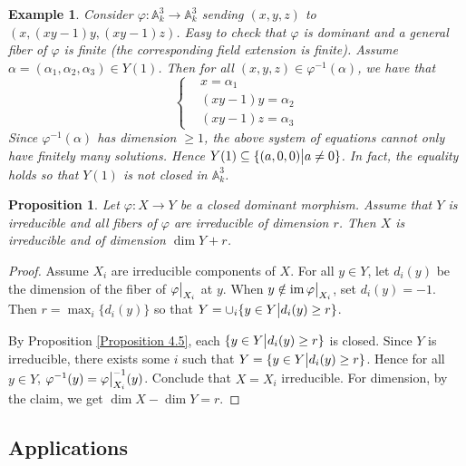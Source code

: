 \documentclass{ctexart}
\newtheorem{proposition}{Proposition}[section]
\newtheorem{example}{Example}[section]
\newcommand{\im}{\operatorname{im}}
\begin{document}
\begin{example}
    Consider $\varphi: \mathbb{A}_{k}^{3} \rightarrow \mathbb{A}_{k}^{3}$ sending $(x, y, z)$ to $(x, (xy - 1)y, (xy - 1)z)$.
    Easy to check that $\varphi$ is dominant and a general fiber of $\varphi$ is finite (the corresponding field extension is finite).
    Assume $\alpha = (\alpha_{1}, \alpha_{2}, \alpha_{3})\in Y(1)$.
    Then for all $(x, y, z)\in \varphi^{-1}(\alpha)$, we have that
    \begin{equation}
        \left\{
            \begin{aligned}
                & x = \alpha_{1} \\
                & (xy - 1)y = \alpha_{2} \\
                & (xy - 1)z = \alpha_{3}
            \end{aligned}
        \right.
        \label{equation:defining_equations_of_fiber_at_alpha}
    \end{equation}
    Since $\varphi^{-1}(\alpha)$ has dimension $\ge 1$, the above system of equations cannot only have finitely many solutions.
    Hence $Y(1) \subseteq \{(a, 0, 0) \big{|} a \neq 0\}$.
    In fact, the equality holds so that $Y(1)$ is not closed in $\mathbb{A}_{k}^{3}$.
\end{example}
\begin{proposition}
    Let $\varphi: X \rightarrow Y$ be a closed dominant morphism.
    Assume that $Y$ is irreducible and all fibers of $\varphi$ are irreducible of dimension $r$.
    Then $X$ is irreducible and of dimension $\dim Y + r$.
    \label{Proposition 4.6}
\end{proposition}
\begin{proof}
    Assume $X_{i}$ are irreducible components of $X$.
    For all $y\in Y$, let $d_{i}(y)$ be the dimension of the fiber of $\varphi\big{|}_{X_{i}}$ at $y$.
    When $y\notin \im \varphi\big{|}_{X_{i}}$, set $d_{i}(y) = -1$.
    Then $r = \max_{i} \{d_{i}(y)\}$ so that $Y = \cup_{i} \{y\in Y \big{|} d_{i}(y) \ge r\}$.
    \par
    By Proposition \ref{Proposition 4.5}, each $\{y\in Y \big{|} d_{i}(y) \ge r\}$ is closed.
    Since $Y$ is irreducible, there exists some $i$ such that $Y = \{y\in Y \big{|} d_{i}(y) \ge r\}$.
    Hence for all $y\in Y$, $\varphi^{-1}(y) = \varphi\big{|}_{X_{i}}^{-1}(y)$.
    Conclude that $X = X_{i}$ irreducible.
    For dimension, by the claim, we get $\dim X - \dim Y = r$.
\end{proof}

\subsection{Applications}
\label{subsection:Dimension_Theory_Applications}
\end{document}
